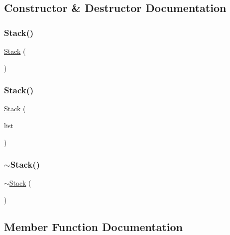 \subsection{Constructor \& Destructor Documentation}
\mbox{\label{classStack_a7bda4597c418045448855db1ad87dbc5}} 
\subsubsection{\texorpdfstring{Stack()}{Stack()}\hspace{0.1cm}{\footnotesize\ttfamily [1/2]}}
{\footnotesize\ttfamily \mbox{\hyperlink{classStack}{Stack}} (\begin{DoxyParamCaption}{ }\end{DoxyParamCaption})}

\mbox{\label{classStack_aecafaaaa5e02b2c138a10f6482963634}} 
\subsubsection{\texorpdfstring{Stack()}{Stack()}\hspace{0.1cm}{\footnotesize\ttfamily [2/2]}}
{\footnotesize\ttfamily \mbox{\hyperlink{classStack}{Stack}} (\begin{DoxyParamCaption}\item[{std\+::initializer\+\_\+list$<$ Value\+Type $>$}]{list }\end{DoxyParamCaption})}

\mbox{\label{classStack_ade4f41695c7ea04c2aec4babf349f280}} 
\subsubsection{\texorpdfstring{$\sim$\+Stack()}{~Stack()}}
{\footnotesize\ttfamily $\sim$\mbox{\hyperlink{classStack}{Stack}} (\begin{DoxyParamCaption}{ }\end{DoxyParamCaption})\hspace{0.3cm}{\ttfamily [virtual]}}



\subsection{Member Function Documentation}
\mbox{\label{classStack_ab901606bf3a8019c986f0cf9a9f298dc}} 
